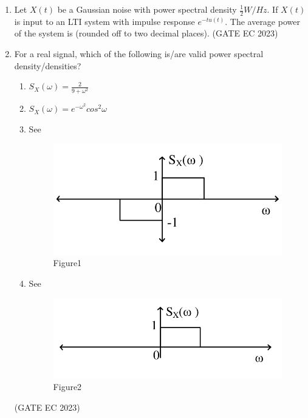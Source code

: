 \begin{enumerate}[label=\thechapter.\arabic*,ref=\thechapter.\theenumi]
\item Let $X(t)$ be a Gaussian noise with power spectral density $\frac{1}{2} W/Hz$. If $X(t)$ is input to an LTI system with impulse response $e^{-tu(t)}$. The average power of the system is (rounded off to two decimal places).
\hfill(GATE EC 2023)\\

\item For a real signal, which of the following is/are valid power spectral density/densities?
\begin{enumerate}
\item \label{eq:30/2023/1}$S_X(\omega)=\frac{2}{9+\omega^2}$\\
\item \label{eq:30/2023/2}$S_X(\omega)=e^{-\omega^2}cos^2{\omega}$
\item See 
\begin{figure}[ht]
	\centering
	\includegraphics[width=\columnwidth]{2023/EC/30/figs/fig1.png}
    \caption{Figure1}
	\label{Fig:Figure1}
\end{figure}
\item See 
\begin{figure}[ht!]
	\centering
	\includegraphics[width=\columnwidth]{2023/EC/30/figs/fig2.png}
    \caption{Figure2}
	\label{Fig:Figure2}
\end{figure}
\end{enumerate}
\hfill(GATE EC 2023)\\

\end{enumerate}
